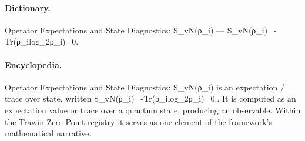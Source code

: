 \paragraph{Dictionary.}
Operator Expectations and State Diagnostics: S\_vN(ρ\_i) — S\_vN(ρ\_i)=-Tr(ρ\_ilog\_2ρ\_i)=0.

\paragraph{Encyclopedia.}
Operator Expectations and State Diagnostics: S\_vN(ρ\_i) is an expectation / trace over state, written S\_vN(ρ\_i)=-Tr(ρ\_ilog\_2ρ\_i)=0.. It is computed as an expectation value or trace over a quantum state, producing an observable. Within the Trawin Zero Point registry it serves as one element of the framework's mathematical narrative.

